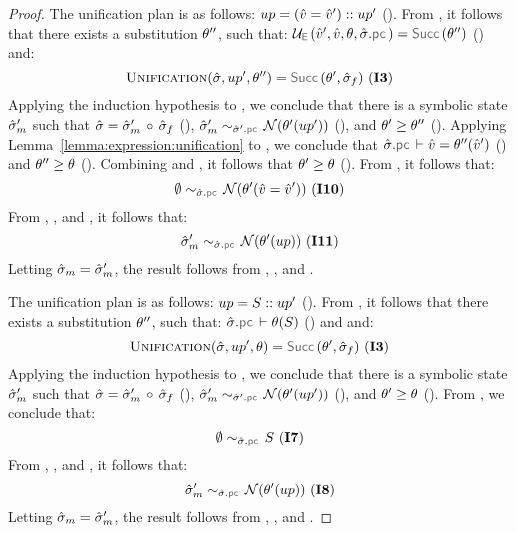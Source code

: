 \begin{proof}
\noindent {} The unification plan is as follows: 
$up =(\hat{v} = \hat{v}') :: up'$ (). 
From , it follows that there exists a substitution $\theta''$, such that: 
$\unifylexpr(\sexprv', \sexprv, \subst, \sstate.\pcsel) = \success{\subst''}$ () 
and:
$$
\unificationfunction(\sstate, \up', \subst'') = \success{\subst', \sstate_f} \text{ (\ieq{3})}
$$
%
Applying the induction hypothesis to , we conclude that there is a symbolic state 
$\hat{\sigma}_m'$ such that  $\hat{\sigma} = \hat{\sigma}_m' \, \circ  \, \hat{\sigma}_f$ (), 
$\stateequivrel{\sstate_m'}{\normaliser(\subst'(\up'))}{\sstate'.\pcsel}$ (), and $\theta' \geq \theta''$ (). 
%
Applying Lemma~\ref{lemma:expression:unification} to , we conclude that 
$\sstate.\pcsel \vdash \sexprv = \subst''(\sexprv')$ () and $\theta'' \geq \theta$ (). 
%
Combining  and , it follows that $\theta' \geq \theta$ (). 
%
From , it follows that: 
$$
\stateequivrel{\emptystate}{\normaliser(\subst'(\sexprv = \sexprv'))}{\sstate.\pcsel} \text{ (\ieq{10})}
$$
From , , and , it follows that: 
$$
\stateequivrel{\sstate_m'}{\normaliser(\subst'(\up))}{\sstate.\pcsel} \text{ (\ieq{11})}
$$
Letting $\hat{\sigma}_m = \hat{\sigma}_m'$, the result follows 
from , , and .
\vspace{5pt}


\noindent {} The unification plan is as follows: 
$up = S :: up'$ (). 
From , it follows that there exists a substitution $\theta''$, such that: 
$\sstate.\pcsel \vdash \subst(\sass)$ () and 
and:
$$
\unificationfunction(\sstate, \up', \subst) = \success{\subst', \sstate_f} \text{ (\ieq{3})}
$$
%
Applying the induction hypothesis to , we conclude that there is a symbolic state 
$\hat{\sigma}_m'$ such that  $\hat{\sigma} = \hat{\sigma}_m' \, \circ  \, \hat{\sigma}_f$ (), 
$\stateequivrel{\sstate_m'}{\normaliser(\subst'(\up'))}{\sstate'.\pcsel}$ (), and $\theta' \geq \theta$ (). 
From , we conclude that: 
$$
\stateequivrel{\emptystate}{\sass}{\sstate.\pcsel} \text{ (\ieq{7})}
$$
From , , and , it follows that: 
$$
\stateequivrel{\sstate_m'}{\normaliser(\subst'(\up))}{\sstate.\pcsel} \text{ (\ieq{8})}
$$
Letting $\hat{\sigma}_m = \hat{\sigma}_m'$, the result follows 
from , , and .
\end{proof}
 
%


